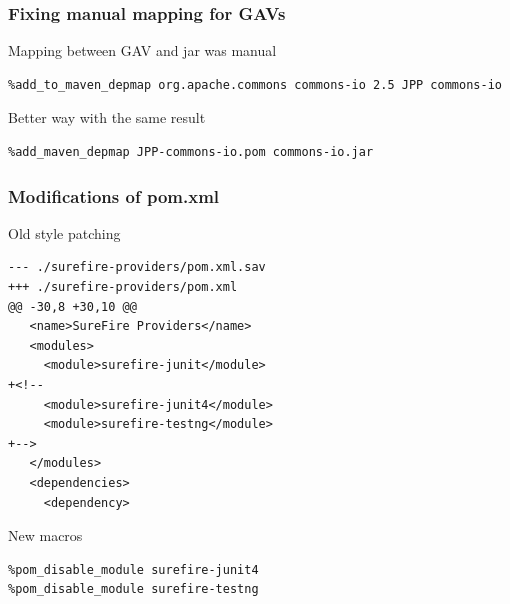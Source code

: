 \documentclass[pdftex,unicode,xcolor=table]{beamer}
\begin{document}
\begin{frame}[fragile]
\scriptsize
  \frametitle{Fixing manual mapping for GAVs}
  \begin{block}{Mapping between GAV and jar was manual}
\begin{verbatim}
%add_to_maven_depmap org.apache.commons commons-io 2.5 JPP commons-io
\end{verbatim}
  \end{block}
  \begin{block}{Better way with the same result}
\begin{verbatim}
%add_maven_depmap JPP-commons-io.pom commons-io.jar
\end{verbatim}
  \end{block}
\end{frame}


\begin{frame}[fragile]
  \scriptsize
\frametitle{Modifications of pom.xml}
  \begin{block}{Old style patching}
\begin{verbatim}
--- ./surefire-providers/pom.xml.sav
+++ ./surefire-providers/pom.xml
@@ -30,8 +30,10 @@
   <name>SureFire Providers</name>
   <modules>
     <module>surefire-junit</module>
+<!--
     <module>surefire-junit4</module>
     <module>surefire-testng</module>
+-->
   </modules>
   <dependencies>
     <dependency>
\end{verbatim}
\end{block}

  \begin{block}{New macros}
\begin{verbatim}
%pom_disable_module surefire-junit4
%pom_disable_module surefire-testng
\end{verbatim}
\end{block}
\end{frame}
\end{document}
